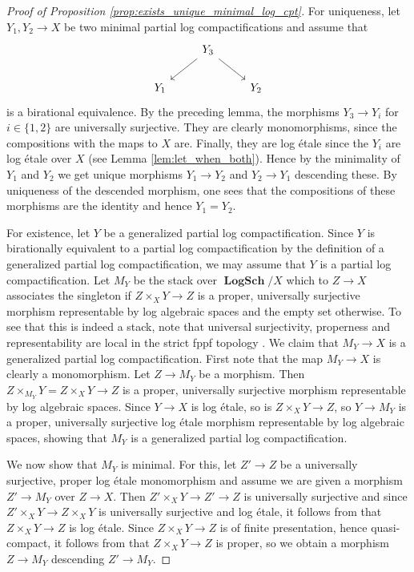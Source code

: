 \documentclass[11pt]{amsart}
\theoremstyle{definition}
\theoremstyle{remark}
\DeclareMathOperator{\LogSch}{\mathbf{LogSch}}
\begin{document}
\begin{proof}[Proof of Proposition \ref{prop:exists_unique_minimal_log_cpt}]
	For uniqueness, let $Y_1,Y_2\to X$ be two minimal partial log compactifications and assume
	that
	$$\begin{tikzcd}
	 &Y_3\arrow[dr]\arrow[dl]&\\
		Y_1&&Y_2
	\end{tikzcd}$$
	is a birational equivalence.
	By the preceding lemma, the morphisms $Y_{3}\to Y_i$ for $i\in \{1,2\}$
	are universally surjective. They are clearly monomorphisms,
	since the compositions with the maps to $X$ are. Finally,
	they are log étale since the $Y_i$ are log étale over $X$ (see Lemma \ref{lem:let_when_both}). Hence by the minimality of
	$Y_1$ and $Y_2$ we get unique morphisms $Y_1\to Y_2$
	and $Y_2\to Y_1$ descending these. By uniqueness of the descended
	morphism, one sees that the compositions of these morphisms
	are the identity and hence $Y_1=Y_2$.

	For existence, let $Y$ be a generalized partial log compactification.
	Since $Y$ is birationally equivalent to a partial log compactification by
	the definition of a generalized partial log compactification, we may assume
	that $Y$ is a partial log compactification.
	Let $M_Y$ be the stack over $\LogSch/X$ which to
	$Z\to X$ associates the singleton if $Z\times_X Y\to Z$
	is a proper, universally surjective morphism representable by log algebraic spaces and
	the empty set otherwise. To see that this is indeed a stack,
	note that universal surjectivity, properness and representability are local in the
	strict fppf topology \cite[Tags 02L1, 02KV and 0ADV]{stacks-project}.
	We claim that $M_Y\to X$ is a generalized partial
	log compactification. First note that the map $M_Y\to X$ is clearly
	a monomorphism. Let $Z\to M_Y$ be a morphism. Then
	$Z\times_{M_Y}Y=Z\times_{X}Y\to Z$ is a proper, universally surjective morphism representable
	by log algebraic spaces. Since $Y\to X$ is log étale, so is $Z\times_X Y\to Z$,
	so $Y\to M_Y$ is a proper, universally surjective log étale morphism representable
	by log algebraic spaces, showing that $M_Y$ is a generalized partial log compactification.

	We now show that $M_Y$ is minimal. For this,
	let $Z'\to Z$ be a universally surjective, proper log étale monomorphism
	and assume we are given a morphism $Z'\to M_Y$ over $Z\to X$. Then
	$Z'\times_X Y\to Z'\to Z$ is universally surjective and since $Z'\times_X Y\to Z\times_X Y$
	is universally surjective and log étale, it follows from \cite{On_log_flat_des_Illusi_2013}
	that $Z\times_X Y\to Z$ is log étale. Since $Z\times_X Y\to Z$
	is of finite presentation, hence quasi-compact, it follows
	from \cite[Proposition 5.7 and Proposition 2.6]{Grothendieck_to_Hu_Xi_2025}
	that $Z\times_X Y\to Z$ is proper, so we obtain a morphism
	$Z\to M_Y$ descending $Z'\to M_Y$.


\end{proof}
\end{document}
